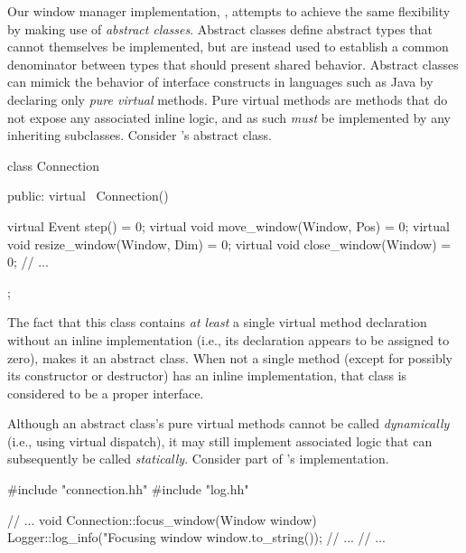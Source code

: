 
Our \cpp window manager implementation, \wmcpp, attempts to achieve the same
flexibility by making use of \textit{abstract classes}. Abstract classes define
abstract types that cannot themselves be implemented, but are instead used
to establish a common denominator between types that should present shared
behavior. Abstract classes can mimick the behavior of interface constructs in
languages such as Java by declaring only \textit{pure virtual} methods. Pure
virtual methods are methods that do not expose any associated inline logic, and
as such \textit{must} be implemented by any inheriting subclasses. Consider
\wmcpp's  abstract class.


\begin{cppblock}
  class Connection
  {
  public:
    virtual ~Connection() {}
  
    virtual Event step() = 0;
    virtual void move_window(Window, Pos) = 0;
    virtual void resize_window(Window, Dim) = 0;
    virtual void close_window(Window) = 0;
    // ...
  };
\end{cppblock}

The fact that this class contains \textit{at least} a single virtual method
declaration without an inline implementation (i.e., its declaration appears
to be assigned to zero), makes it an abstract class. When not a single
method (except for possibly its constructor or destructor) has an inline
implementation, that class is considered to be a proper interface.

Although an abstract class's pure virtual methods cannot be called
\textit{dynamically} (i.e., using virtual dispatch), it may still implement
associated logic that can subsequently be called \textit{statically}. Consider
part of 's implementation.


\begin{cppblock}
  #include "connection.hh"
  #include "log.hh"

  // ...
  void
  Connection::focus_window(Window window)
  {
    Logger::log_info("Focusing window %
      window.to_string());
    // ...
  }
  // ...
\end{cppblock}

